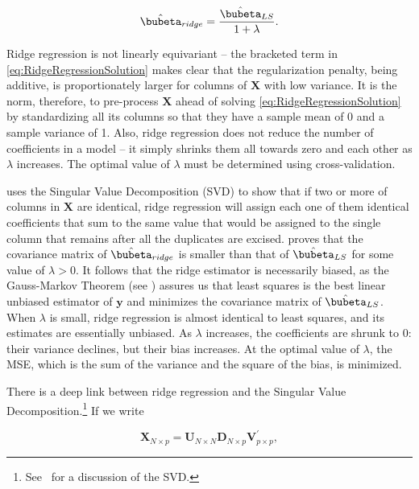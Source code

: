 \documentclass[graybox,envcountchap,sectrefs]{svmono}\usepackage[]{graphicx}\usepackage[]{xcolor}
\begin{document}
\begin{appendices}
\begin{equation}
\hat{\bubeta}_{ridge}=\frac{\hat{\bubeta}_{LS}}{1+\lambda}.\label{eq:RidgevsLSbetaOrthogonal}
\end{equation}

Ridge regression is not linearly equivariant -- the bracketed term
in \eqref{eq:RidgeRegressionSolution} makes clear that the regularization
penalty, being additive, is proportionately larger for columns of
$\mathbf{X}$ with low variance. It is the norm, therefore, to pre-process
$\mathbf{X}$ ahead of solving \eqref{eq:RidgeRegressionSolution}
by standardizing all its columns so that they have a sample mean of
0 and a sample variance of 1. Also, ridge regression does not reduce
the number of coefficients in a model -- it simply shrinks them all
towards zero and each other as $\lambda$ increases. The optimal value
of $\lambda$ must be determined using cross-validation. 

\citet{Hastie2020} uses the Singular Value Decomposition (SVD) to
show that if two or more of columns in $\mathrm{\mathbf{X}}$ are
identical, ridge regression will assign each one of them identical
coefficients that sum to the same value that would be assigned to
the single column that remains after all the duplicates are excised.
\citet{Theobald1974} proves that the covariance matrix of $\hat{\bubeta}_{ridge}$
is smaller than that of $\hat{\bubeta}_{LS}$ for some value of $\lambda>0.$
It follows that the ridge estimator is necessarily biased, as the
Gauss-Markov Theorem (see \ProbabilityAppendix) assures us that least
squares is the best linear unbiased estimator of $\mathrm{\mathbf{y}}$
and minimizes the covariance matrix of $\hat{\bubeta}_{LS}$. When
$\lambda$ is small, ridge regression is almost identical to least
squares, and its estimates are essentially unbiased. As $\lambda$
increases, the coefficients are shrunk to 0: their variance declines,
but their bias increases. At the optimal value of $\lambda$, the
MSE, which is the sum of the variance and the square of the bias,
is minimized. 

There is a deep link between ridge regression and the Singular Value
Decomposition.\footnote{See \MathToolsAppendix\ for a discussion of the SVD.}
If we write

\begin{equation}
\mathrm{\mathbf{X}}_{N\times p}=\mathrm{\mathbf{U}}_{N\times N}\mathrm{\mathbf{D}}_{N\times p}\mathrm{\mathbf{V}}_{p\times p}^{\prime},\label{eq:SVDofX}
\end{equation}


\end{appendices}
\end{document}
